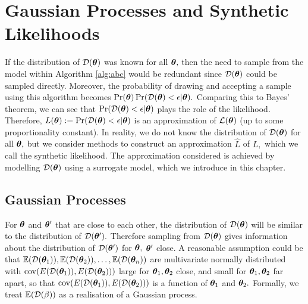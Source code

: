 \chapter{Gaussian Processes and Synthetic Likelihoods}

If the distribution of $\mathcal{D}(\bm{\theta})$ was known for all $\bm{\theta},$ then the need
to sample from the model within Algorithm
\ref{alg:abc} would be redundant since $\mathcal{D}(\bm{\theta})$ could be sampled
directly. Moreover, the probability of drawing and accepting a sample
using this algorithm becomes
$\Pr(\bm{\theta})\Pr(\mathcal{D}(\bm{\theta}) < \epsilon | \bm{\theta}).$ Comparing
this to Bayes' theorem, we can see that $\Pr(\mathcal{D}(\bm{\theta}) < \epsilon | \bm{\theta})$
plays the role of the likelihood. Therefore,
$L(\bm{\theta}) := \Pr(\mathcal{D}(\bm{\theta}) < \epsilon | \bm{\theta})$
is an approximation of $\operatorname{\mathcal{L}}(\bm{\theta})$ (up to some proportionality constant).
In reality, we do not know the distribution of $\mathcal{D}(\bm{\theta})$ for all
$\bm{\theta},$ but we consider methods to construct
an approximation $\hat{L}$ of $L,$ which we call the synthetic likelihood.
The approximation considered is achieved by modelling
$\mathcal{D}(\bm{\theta})$ using a surrogate model, which we introduce in this chapter.

\section{Gaussian Processes}

For $\bm{\theta}$ and $\bm{\theta}^\prime$ that are close to each other,
the distribution of $\mathcal{D}(\bm{\theta})$ will be similar to the distribution of
$\mathcal{D}(\bm{\theta}^\prime).$ Therefore sampling from $\mathcal{D}(\bm{\theta})$ gives information
about the distribution of $\mathcal{D}(\bm{\theta}^\prime)$ for $\bm{\theta},$
$\bm{\theta}^\prime$ close. A reasonable assumption could be that
$\operatorname{\mathbb{E}}(\mathcal{D}(\bm{\theta}_1)), \operatorname{\mathbb{E}}(\mathcal{D}(\bm{\theta}_2)), \dots, \operatorname{\mathbb{E}}(\mathcal{D}(\bm{\theta}_n))$ are
multivariate
normally distributed with $\operatorname{cov}(E(\mathcal{D}(\bm{\theta}_1)), E(\mathcal{D}(\bm{\theta}_2)))$ large for
$\bm{\theta}_1, \bm{\theta}_2$ close, and small for $\bm{\theta}_1, \bm{\theta}_2$ far apart,
so that $\operatorname{cov}(E(\mathcal{D}(\bm{\theta}_1)), E(\mathcal{D}(\bm{\theta}_2)))$ is a function of $\bm{\theta}_1$
and $\bm{\theta}_2.$
Formally, we treat $\operatorname{\mathbb{E}}(\mathcal{D}(\beta))$ as a realisation of a Gaussian process.

